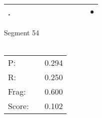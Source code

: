 \documentclass[landscape]{article}
\newcommand{\ssp}{\hspace{2pt}}
\newcommand{\mex}{\cellcolor{g}$\bullet$}
\begin{document}
\begin{tabular}{|l|p{10pt}|p{10pt}|p{10pt}|p{10pt}|p{10pt}|p{10pt}|p{10pt}|p{10pt}|p{10pt}|p{10pt}|}
\hline
\ssp \cellcolor{ref9}. \ssp&\hspace{2pt}&\hspace{2pt}&\hspace{2pt}&\hspace{2pt}&\hspace{2pt}&\hspace{2pt}&\hspace{2pt}&\hspace{2pt}&\hspace{2pt}&\hspace{2pt}\mex\\
\hline
\end{tabular}

\vspace{6pt}
\noindent Segment 54\\\\
\noindent\begin{tabular}{lm{12pt}r}
\hline
P:&&0.294\\
R:&&0.250\\
Frag:&&0.600\\
Score:&&0.102\\
\end{tabular}

\newpage
\end{document}
